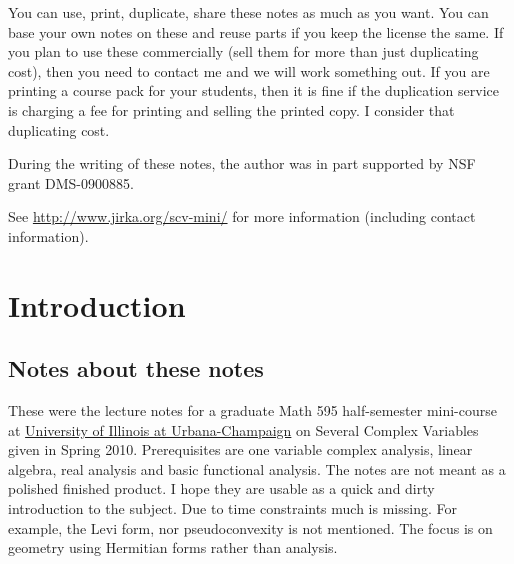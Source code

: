 \documentclass[12pt,openany]{book}
\theoremstyle{plain}
\theoremstyle{remark}
\theoremstyle{definition}
\theoremstyle{exercise}
\theoremstyle{example}
\begin{document}
\bigskip

\noindent
You can use, print, duplicate, share these notes as much as you want.  You can
base your own notes on these and reuse parts if you keep the license the
same.  If you plan to use these commercially (sell them for more than just
duplicating cost), then you need to contact me and we will work something out.
If you are printing a course pack for your students, then it is fine if the 
duplication service is charging a fee for printing and selling the printed
copy.  I consider that duplicating cost.

\bigskip

\noindent
During the writing of these notes, 
the author was in part supported by NSF grant DMS-0900885.

\bigskip

\noindent
See \url{http://www.jirka.org/scv-mini/} for more information
(including contact information).



\tableofcontents
{}

\newpage


\chapter*{Introduction}


\section{Notes about these notes}

These were the lecture notes for a graduate Math 595 half-semester
mini-course at \href{http://www.math.uiuc.edu/}{University of Illinois at
Urbana-Champaign} on Several Complex Variables given in Spring 2010.
Prerequisites are one variable complex analysis, linear algebra, real
analysis and basic functional analysis.  The notes are not meant as a
polished finished product.  I hope they are usable as a quick and dirty
introduction to the subject.  Due to time constraints much is missing.  For
example, the Levi form, nor pseudoconvexity is not mentioned.  The focus is
on geometry using Hermitian forms rather than analysis.
\end{document}

